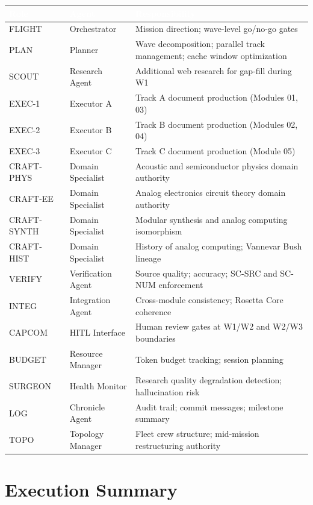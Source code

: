 \documentclass[11pt,letterpaper]{article}
\newcommand{\tableheader}[1]{\textbf{\sffamily\textcolor{white}{#1}}}
\begin{document}
\begin{center}
\begin{tabularx}{\textwidth}{L{2cm}L{3cm}X}
\toprule
{}
\tableheader{Role} & \tableheader{Agent} & \tableheader{Responsibility} \\
\midrule
FLIGHT & Orchestrator & Mission direction; wave-level go/no-go gates \\
PLAN & Planner & Wave decomposition; parallel track management; cache window optimization \\
SCOUT & Research Agent & Additional web research for gap-fill during W1 \\
EXEC-1 & Executor A & Track A document production (Modules 01, 03) \\
EXEC-2 & Executor B & Track B document production (Modules 02, 04) \\
EXEC-3 & Executor C & Track C document production (Module 05) \\
CRAFT-PHYS & Domain Specialist & Acoustic and semiconductor physics domain authority \\
CRAFT-EE & Domain Specialist & Analog electronics circuit theory domain authority \\
CRAFT-SYNTH & Domain Specialist & Modular synthesis and analog computing isomorphism \\
CRAFT-HIST & Domain Specialist & History of analog computing; Vannevar Bush lineage \\
VERIFY & Verification Agent & Source quality; accuracy; SC-SRC and SC-NUM enforcement \\
INTEG & Integration Agent & Cross-module consistency; Rosetta Core coherence \\
CAPCOM & HITL Interface & Human review gates at W1/W2 and W2/W3 boundaries \\
BUDGET & Resource Manager & Token budget tracking; session planning \\
SURGEON & Health Monitor & Research quality degradation detection; hallucination risk \\
LOG & Chronicle Agent & Audit trail; commit messages; milestone summary \\
TOPO & Topology Manager & Fleet crew structure; mid-mission restructuring authority \\
\bottomrule
\end{tabularx}
\end{center}

\section{Execution Summary}
\end{document}
